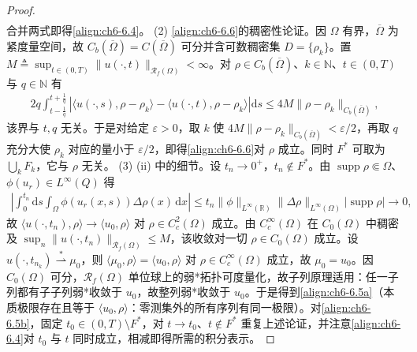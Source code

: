 \documentclass[../../main.tex]{subfiles}%
\begin{document}
\begin{proof}
\begin{align*}
\end{align*}
合并两式即得\eqref{align:ch6-6.4}。
(2) \eqref{align:ch6-6.6}的稠密性论证。因 $\Omega$ 有界，$\overline\Omega$ 为紧度量空间，故 $C_b(\overline\Omega)=C(\overline\Omega)$ 可分并含可数稠密集 $D=\{\rho_k\}$。置 $M\triangleq\sup_{t\in(0,T)}\|u(\cdot,t)\|_{\mathscr{R}_f(\Omega)}<\infty$。对 $\rho\in C_b(\overline\Omega)$、$k\in\mathbb{N}$、$t\in(0,T)$ 与 $q\in\mathbb{N}$ 有
\begin{align*}
2q\int_{t-\frac{1}{q}}^{t+\frac{1}{q}}
\left|\langle u(\cdot,s),\rho-\rho_k\rangle-\langle u(\cdot,t),\rho-\rho_k\rangle\right|\mathrm{d}s
\leqslant 4M\|\rho-\rho_k\|_{C_b(\overline\Omega)} ,
\end{align*}
该界与 $t,q$ 无关。于是对给定 $\varepsilon>0$，取 $k$ 使 $4M\|\rho-\rho_k\|_{C_b(\overline\Omega)}<\varepsilon/2$，再取 $q$ 充分大使 $\rho_k$ 对应的量小于 $\varepsilon/2$，即得\eqref{align:ch6-6.6}对 $\rho$ 成立。同时 $F^*$ 可取为 $\bigcup_kF_k$，它与 $\rho$ 无关。
(3) (ii) 中的细节。设 $t_n\to0^+$，$t_n\notin F^*$。由 $\operatorname{supp}\rho\Subset\Omega$、$\phi(u_r)\in L^\infty(Q)$ 得
\begin{align*}
\left|\int_0^{t_n}\mathrm{d}s\int_\Omega\phi(u_r(x,s))\Delta\rho(x)\,\mathrm{d}x\right|
\leqslant t_n\|\phi\|_{L^\infty(\mathbb{R})}\|\Delta\rho\|_{L^\infty(\Omega)}|\operatorname{supp}\rho|\to0,
\end{align*}
故 $\langle u(\cdot,t_n),\rho\rangle\to\langle u_0,\rho\rangle$ 对 $\rho\in C^2_c(\Omega)$ 成立。由 $C^\infty_c(\Omega)$ 在 $C_0(\Omega)$ 中稠密及 $\sup_n\|u(\cdot,t_n)\|_{\mathscr{R}_f(\Omega)}\leqslant M$，该收敛对一切 $\rho\in C_0(\Omega)$ 成立。设 $u(\cdot,t_{n_k})\stackrel{*}{\rightharpoonup}\mu_0$，则 $\langle\mu_0,\rho\rangle=\langle u_0,\rho\rangle$ 对 $\rho\in C^\infty_c(\Omega)$ 成立，故 $\mu_0=u_0$。因 $C_0(\Omega)$ 可分，$\mathscr{R}_f(\Omega)$ 单位球上的弱*拓扑可度量化，故子列原理适用：任一子列都有子子列弱*收敛于 $u_0$，故整列弱*收敛于 $u_0$。于是得到\eqref{align:ch6-6.5a}（本质极限存在且等于 $\langle u_0,\rho\rangle$：零测集外的所有序列有同一极限）。对\eqref{align:ch6-6.5b}，固定 $t_0\in(0,T)\setminus F^*$，对 $t\to t_0$、$t\notin F^*$ 重复上述论证，并注意\eqref{align:ch6-6.4}对 $t_0$ 与 $t$ 同时成立，相减即得所需的积分表示。
\end{proof}
\end{document}
